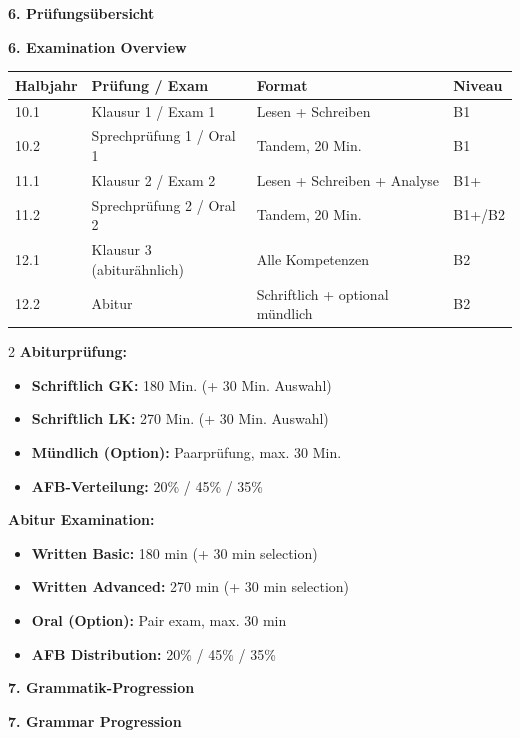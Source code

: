 \documentclass[10pt,a4paper]{article}
\newcommand{\bil}[2]{%
\begin{paracol}{2}
\small #1
\switchcolumn
\small\textcolor{english}{#2}
\end{paracol}
}
\newcommand{\secbil}[2]{%
\vspace{8pt}
\noindent\colorbox{spanisch}{\parbox{0.48\textwidth}{\color{white}\bfseries #1}}%
\hfill%
\colorbox{english}{\parbox{0.48\textwidth}{\color{white}\bfseries #2}}
\vspace{4pt}
}
\begin{document}
\newpage

\secbil{6. Prüfungsübersicht}{6. Examination Overview}

\vspace{2mm}

\begin{center}
\small
\begin{tabular}{|l|l|l|l|}
\hline
\rowcolor{lightgray}
\textbf{Halbjahr} & \textbf{Prüfung / Exam} & \textbf{Format} & \textbf{Niveau} \\
\hline
10.1 & Klausur 1 / Exam 1 & Lesen + Schreiben & B1 \\
\hline
10.2 & Sprechprüfung 1 / Oral 1 & Tandem, 20 Min. & B1 \\
\hline
11.1 & Klausur 2 / Exam 2 & Lesen + Schreiben + Analyse & B1+ \\
\hline
11.2 & Sprechprüfung 2 / Oral 2 & Tandem, 20 Min. & B1+/B2 \\
\hline
12.1 & Klausur 3 (abiturähnlich) & Alle Kompetenzen & B2 \\
\hline
12.2 & Abitur & Schriftlich + optional mündlich & B2 \\
\hline
\end{tabular}
\end{center}

\vspace{3mm}

\bil{%
\textbf{Abiturprüfung:}
\begin{itemize}[noitemsep,topsep=2pt]
\item \textbf{Schriftlich GK:} 180 Min. (+ 30 Min. Auswahl)
\item \textbf{Schriftlich LK:} 270 Min. (+ 30 Min. Auswahl)
\item \textbf{Mündlich (Option):} Paarprüfung, max. 30 Min.
\item \textbf{AFB-Verteilung:} 20\% / 45\% / 35\%
\end{itemize}
}{%
\textbf{Abitur Examination:}
\begin{itemize}[noitemsep,topsep=2pt]
\item \textbf{Written Basic:} 180 min (+ 30 min selection)
\item \textbf{Written Advanced:} 270 min (+ 30 min selection)
\item \textbf{Oral (Option):} Pair exam, max. 30 min
\item \textbf{AFB Distribution:} 20\% / 45\% / 35\%
\end{itemize}
}

\secbil{7. Grammatik-Progression}{7. Grammar Progression}
\end{document}
